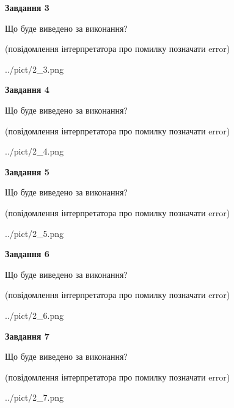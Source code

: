 \documentclass[12pt, ukrainian]{article}
\begin{document}
{\begin {large}
{\begin {center}\textbf{Завдання 3}\end {center}}\par
Що буде виведено за виконання?\par
 (повідомлення інтерпретатора про помилку позначати error)\par
\begin{center}
	{../pict/2_3.png}
\end{center}
\newpage

{\begin {center}\textbf{Завдання 4}\end {center}}\par
Що буде виведено за виконання?\par
 (повідомлення інтерпретатора про помилку позначати error)\par
\begin{center}
	{../pict/2_4.png}
\end{center}
\newpage

{\begin {center}\textbf{Завдання 5}\end {center}}\par
Що буде виведено за виконання?\par
 (повідомлення інтерпретатора про помилку позначати error)\par
\begin{center}
	{../pict/2_5.png}
\end{center}
\newpage

{\begin {center}\textbf{Завдання 6}\end {center}}\par
Що буде виведено за виконання?\par
 (повідомлення інтерпретатора про помилку позначати error)\par
\begin{center}
	{../pict/2_6.png}
\end{center}
\newpage

{\begin {center}\textbf{Завдання 7}\end {center}}\par
Що буде виведено за виконання?\par
 (повідомлення інтерпретатора про помилку позначати error)\par
\begin{center}
	{../pict/2_7.png}
\end{center}
\newpage


\end{large}}
\end{document}
